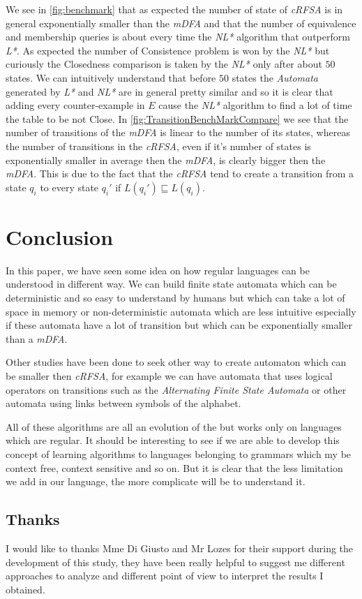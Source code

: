 We see in \cref{fig:benchmark} that as expected the number of state of \textit{cRFSA} is in general exponentially smaller than the \textit{mDFA} and that the number of equivalence and membership queries is about every time the \textit{NL*} algorithm that outperform \textit{L*}. As expected the number of Consistence problem is won by the \textit{NL*} but curiously the Closedness comparison is taken by the \textit{NL*} only after about $50$ states. We can intuitively understand that before $50$ states the \textit{Automata} generated by \textit{L*} and \textit{NL*} are in general pretty similar and so it is clear that adding every counter-example in $E$ cause the \textit{NL*} algorithm to find a lot of time the table to be not Close. In \cref{fig:TransitionBenchMarkCompare} we see that the number of transitions of the \textit{mDFA} is linear to the number of its states, whereas the number of transitions in the \textit{cRFSA}, even if it's number of states is exponentially smaller in average then the \textit{mDFA}, is clearly bigger then the \textit{mDFA}. This is due to the fact that the \textit{cRFSA} tend to create a transition from a state $q_i$ to every state $q_i'$ if $L(q_i') \sqsubseteq L(q_i)$.

\section{Conclusion}

In this paper, we have seen some idea on how regular languages can be understood in different way. We can build finite state automata which can be deterministic and so easy to understand by humans but which can take a lot of space in memory or non-deterministic automata which are less intuitive especially if these automata have a lot of transition but which can be exponentially smaller than a \textit{mDFA}.

Other studies have been done to seek other way to create automaton which can be smaller then \textit{cRFSA}, for example we can have automata that uses logical operators on transitions such as the \textit{Alternating Finite State Automata} or other automata using links between symbols of the alphabet.

All of these algorithms are all an evolution of the \cite{LPaper} but works only on languages which are regular. It should be interesting to see if we are able to develop this concept of learning algorithms to languages belonging to grammars which my be context free, context sensitive and so on. But it is clear that the less limitation we add in our language, the more complicate will be to understand it.

\subsection{Thanks}
I would like to thanks Mme Di Giusto and Mr Lozes for their support during the development of this study, they have been really helpful to suggest me different approaches to analyze and different point of view to interpret the results I obtained.